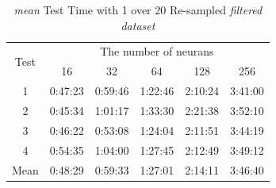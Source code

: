 \documentclass[draft,dvipsnames]{drexel-thesis}
\begin{document}
\begin{thesis}
\begin{table}[!t]
\centering
\caption{{\em mean} Test Time with 1 over 20 Re-sampled {\em filtered dataset}}
\label{tbl:mean_1_20_time}
\begin{tabular}{|c|c|c|c|c|c|}
\hline
\multirow{2}{*}{Test}      & \multicolumn{5}{c|}{The number of neurans}                                                                                                               \\ \cline{2-6}
                           & 16                           & 32                           & 64                           & 128                          & 256                          \\ \hline
1                          & 0:47:23                      & 0:59:46                      & 1:22:46                      & 2:10:24                      & 3:41:00                      \\ \hline
2                          & 0:45:34                      & 1:01:17                      & 1:33:30                      & 2:21:38                      & 3:52:10                      \\ \hline
3                          & 0:46:22                      & 0:53:08                      & 1:24:04                      & 2:11:51                      & 3:44:19                      \\ \hline
4                          & 0:54:35                      & 1:04:00                      & 1:27:45                      & 2:12:49                      & 3:49:12                      \\ \hline
\multicolumn{1}{|l|}{Mean} & \multicolumn{1}{l|}{0:48:29} & \multicolumn{1}{l|}{0:59:33} & \multicolumn{1}{l|}{1:27:01} & \multicolumn{1}{l|}{2:14:11} & \multicolumn{1}{l|}{3:46:40} \\ \hline
\end{tabular}
\end{table}


\end{thesis}
\end{document}
